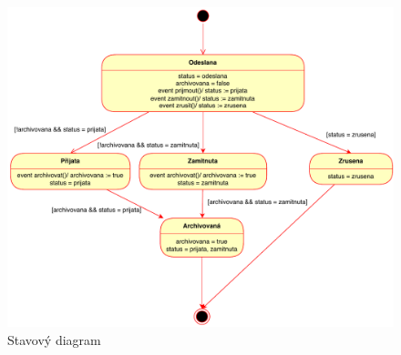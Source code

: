\documentclass{article}
\begin{document}
\clearpage

\begin{figure}[p]
    \centering
    \includegraphics[scale=0.9]{fig/stavy.drawio.pdf}
    \caption{Stavový diagram}
\end{figure}

\restoregeometry
\end{document}
